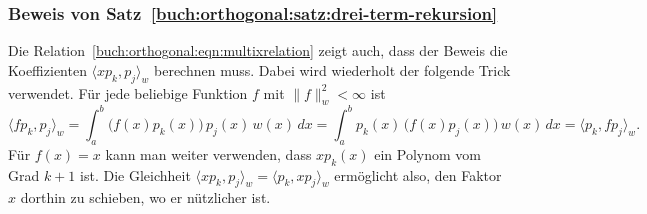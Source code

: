 %
%
\subsubsection{Beweis von Satz~\ref{buch:orthogonal:satz:drei-term-rekursion}}
Die Relation~\eqref{buch:orthogonal:eqn:multixrelation} zeigt auch,
dass der Beweis die Koeffizienten $\langle xp_k,p_j\rangle_w$
berechnen muss.
Dabei wird wiederholt der folgende Trick verwendet.
Für jede beliebige Funktion $f$ mit $\|f\|_w^2<\infty$ ist
\[
\langle fp_k,p_j\rangle_w
=
\int_a^b \bigl(f(x)p_k(x)\bigr)\,p_j(x)\,w(x)\,dx
=
\int_a^b p_k(x)\,\bigl(f(x)p_j(x)\bigr)\,w(x)\,dx
=
\langle p_k,fp_j\rangle_w.
\]
Für $f(x)=x$ kann man weiter verwenden, dass $xp_k(x)$ ein Polynom
vom Grad $k+1$ ist.
Die Gleichheit $\langle xp_k,p_j\rangle_w=\langle p_k,xp_j\rangle_w$
ermöglicht also, den Faktor $x$ dorthin zu schieben, wo er nützlicher ist.

